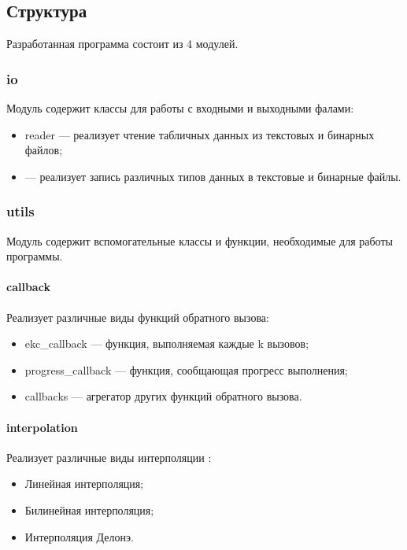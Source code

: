 \documentclass{fefu}
\begin{document}
        \subsection{Структура}
            \par Разработанная программа состоит из 4 модулей.
            \subsubsection{io}
                \par Модуль содержит классы для работы с входными и выходными фалами:
                \begin{itemize}
                    \item \textsf{reader} --- реализует чтение табличных данных из текстовых и бинарных файлов;
                    \item {} --- реализует запись различных типов данных в текстовые и бинарные файлы. 
                \end{itemize}
            \subsubsection{utils}
                \par Модуль содержит вспомогательные классы и функции, необходимые для работы программы.
                \paragraph{callback}
                    \par Реализует различные виды функций обратного вызова:
                    \begin{itemize}
                        \item \textsf{ekc\_callback} --- функция, выполняемая каждые \textsf{k} вызовов;
                        \item \textsf{progress\_callback} --- функция, сообщающая прогресс выполнения;
                        \item \textsf{callbacks} --- агрегатор других функций обратного вызова.
                    \end{itemize}
                \paragraph{interpolation}
                    \par Реализует различные виды интерполяции \cite{interpolation}:
                    \begin{itemize}
                        \item Линейная интерполяция;
                        \item Билинейная интерполяция;
                        \item Интерполяция Делонэ.
                    \end{itemize}
\end{document}
